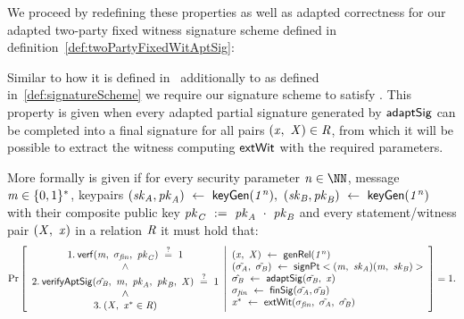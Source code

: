 We proceed by redefining these properties as well as adapted correctness for our adapted two-party fixed witness signature scheme defined in definition~\ref{def:twoPartyFixedWitAptSig}:

\begin{definition}[\cnstAptSigCorrectness]\label{def:aptSigCorrectness}
Similar to how it is defined in~\cite{aumayr2020bitcoinchannels} additionally to \cnstCorrectness as defined in~\ref{def:signatureScheme} we require our signature scheme to satisfy \cnstAptSigCorrectness.
This property is given when every adapted partial signature generated by $\mathsf{adaptSig}$ can be completed into a final signature for all pairs $(\mathit{x} ,~ \mathit{X}) \in \mathit{R}$, from which it will
be possible to extract the witness computing $\mathsf{extWit}$ with the required parameters.

More formally \cnstAptSigCorrectness is given if for every security parameter $\varN \in \cnstNatural$, message $\mathit{m} \in \{0,1\}^{*}$, keypairs $(\mathit{sk}_{\mathit{A}}, \mathit{pk}_{\mathit{A}}) ~\leftarrow~ \mathsf{keyGen}(\mathit{1^n}) ,~
(\mathit{sk}_{\mathit{B}}, \mathit{pk}_{\mathit{B}}) ~\leftarrow~ \mathsf{keyGen}(\mathit{1^n})$
with their composite public key $\mathit{pk}_{\mathit{C}} ~:=~ \mathit{pk}_{\mathit{A}} ~\cdot~ \mathit{pk}_{\mathit{B}}$ and every statement/witness pair $(\mathit{X} ,~ \mathit{x})$ in a relation $\mathit{R}$ it must hold that:
\[
    \Pr\left[
    \begin{array}{c}
        1.\:\mathsf{verf}(\mathit{m} ,~ \sigma_{\mathit{fin}} ,~ \mathit{pk}_{\mathit{C}}) ~\stackrel{?}{=}~ 1 \\
        ~\land~ \\
        2.\: \mathsf{verifyAptSig}(\hat{\sigma_{\mathit{B}}} ,~ \mathit{m} ,~ \mathit{pk}_{\mathit{A}} ,~ \mathit{pk}_{\mathit{B}} ,~ \mathit{X}) ~\stackrel{?}{=}~ 1 \\
        ~\land~ \\
        3.\:(\mathit{X} ,~ \mathit{x}^* \in \mathit{R})
    \end{array}
    \middle\vert
    \begin{array}{l}
        (\mathit{x} ,~ \mathit{X}) ~\leftarrow~ \mathsf{genRel}(\mathit{1^n}) \\
        (\tilde{\sigma_{\mathit{A}}} ,~ \tilde{\sigma_{\mathit{B}}}) ~\leftarrow~ \mathsf{signPt}<(\mathit{m} ,~ \mathit{sk}_{\mathit{A}})(\mathit{m} ,~ \mathit{sk}_{\mathit{B}})> \\
        \hat{\sigma_{\mathit{B}}} ~\leftarrow~ \mathsf{adaptSig}(\tilde{\sigma_{\mathit{B}}} ,~ \mathit{x}) \\
        \sigma_{\mathit{fin}} ~\leftarrow~ \mathsf{finSig}(\tilde{\sigma_{\mathit{A}}},\tilde{\sigma_{\mathit{B}}}) \\
        \mathit{x}^* ~\leftarrow~ \mathsf{extWit}(\sigma_{\mathit{fin}} ,~ \tilde{\sigma_{\mathit{A}}} ,~ \hat{\sigma_{\mathit{B}}})
    \end{array}
    \right]=1.
\]
\end{definition}

